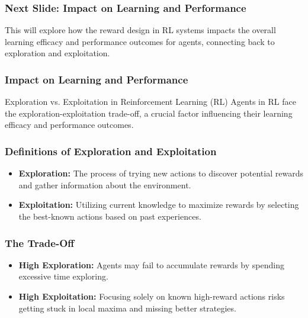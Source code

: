 \documentclass[aspectratio=169]{beamer}
\begin{document}
\begin{frame}
  \frametitle{Next Slide: Impact on Learning and Performance}
  This will explore how the reward design in RL systems impacts the overall learning efficacy and performance outcomes for agents, connecting back to exploration and exploitation.
\end{frame}

\begin{frame}[fragile]
    \frametitle{Impact on Learning and Performance}
    \begin{block}{Exploration vs. Exploitation in Reinforcement Learning (RL)}
    Agents in RL face the exploration-exploitation trade-off, a crucial factor influencing their learning efficacy and performance outcomes.
    \end{block}
\end{frame}

\begin{frame}[fragile]
    \frametitle{Definitions of Exploration and Exploitation}
    \begin{itemize}
        \item \textbf{Exploration:}  
        The process of trying new actions to discover potential rewards and gather information about the environment.
        
        \item \textbf{Exploitation:}  
        Utilizing current knowledge to maximize rewards by selecting the best-known actions based on past experiences.
    \end{itemize}
\end{frame}

\begin{frame}[fragile]
    \frametitle{The Trade-Off}
    \begin{itemize}
        \item \textbf{High Exploration:}    
        Agents may fail to accumulate rewards by spending excessive time exploring.
        
        \item \textbf{High Exploitation:}
        Focusing solely on known high-reward actions risks getting stuck in local maxima and missing better strategies.
    \end{itemize}
\end{frame}
\end{document}
